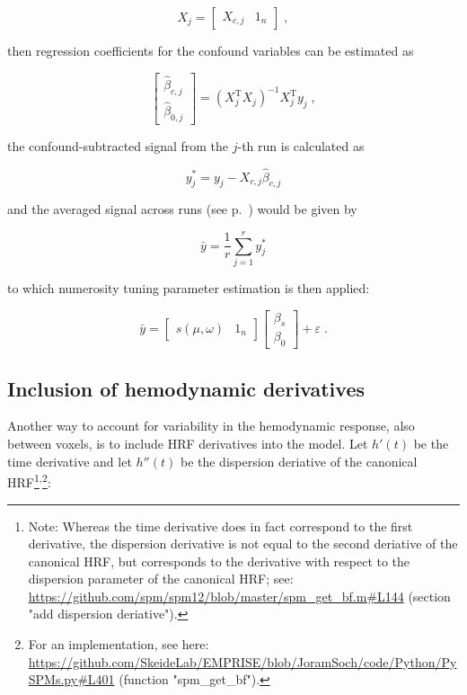 \documentclass[a4paper,12pt]{article}
\begin{document}
\begin{equation} \label{eq:X-j}
X_j = \left[ \begin{matrix} X_{c,j} & 1_n \end{matrix} \right] \; ,
\end{equation}

then regression coefficients for the confound variables can be estimated as

\begin{equation} \label{eq:b-est-X-j}
\left[ \begin{matrix} \hat{\beta}_{c,j} \\ \hat{\beta}_{0,j} \end{matrix} \right] = (X_j^\mathrm{T} X_j)^{-1} X_j^\mathrm{T} y_j \; ,
\end{equation}

the confound-subtracted signal from the $j$-th run is calculated as

\begin{equation} \label{eq:y-j-reg}
y_j^{*} = y_j - X_{c,j} \hat{\beta}_{c,j}
\end{equation}

and the averaged signal across runs (see p.~\pageref{sec:Not}) would be given by

\begin{equation}  \label{eq:y-avg}
\bar{y} = \frac{1}{r} \sum_{j=1}^{r} y_j^{*}
\end{equation}

to which numerosity tuning parameter estimation is then applied:

\begin{equation} \label{eq:y-X-avg}
\bar{y} = \left[ \begin{matrix} s(\mu,\omega) & 1_n \end{matrix} \right] \left[ \begin{matrix} \beta_s \\ \beta_0 \end{matrix} \right] + \varepsilon \; .
\end{equation}


\subsection{Inclusion of hemodynamic derivatives} \label{sec:HRF-der}

Another way to account for variability in the hemodynamic response, also between voxels, is to include HRF derivatives into the model. Let $h'(t)$ be the time derivative and let $h''(t)$ be the dispersion deriative of the canonical HRF\footnote{Note: Whereas the time derivative does in fact correspond to the first derivative, the dispersion derivative is not equal to the second deriative of the canonical HRF, but corresponds to the derivative with respect to the dispersion parameter of the canonical HRF; see: \url{https://github.com/spm/spm12/blob/master/spm_get_bf.m#L144} (section "add dispersion deriative").}\textsuperscript{,}\footnote{For an implementation, see here: \url{https://github.com/SkeideLab/EMPRISE/blob/JoramSoch/code/Python/PySPMs.py#L401} (function "spm\_get\_bf").}:
\end{document}
